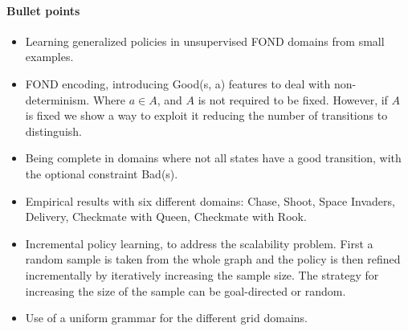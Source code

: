 \documentclass[a4paper]{article}
\begin{document}
\newpage

\paragraph{Bullet points}
\begin{itemize}
\item Learning generalized policies in unsupervised FOND domains from small examples.
\item FOND encoding, introducing Good(s, a) features to deal with non-determinism. Where $a \in A$, and $A$ is not required to be fixed. However, if $A$ is fixed we show a way to exploit it reducing the number of transitions to distinguish.
\item Being complete in domains where not all states have a good transition, with the optional constraint Bad(s).
\item Empirical results with six different domains: Chase, Shoot, Space Invaders, Delivery, Checkmate with Queen, Checkmate with Rook.
\item Incremental policy learning, to address the scalability problem. First a random sample is taken from the whole graph and the policy is then refined incrementally by iteratively increasing the sample size. The strategy for increasing the size of the sample can be goal-directed or random.
\item Use of a uniform grammar for the different grid domains.
\end{itemize}




\end{document}
